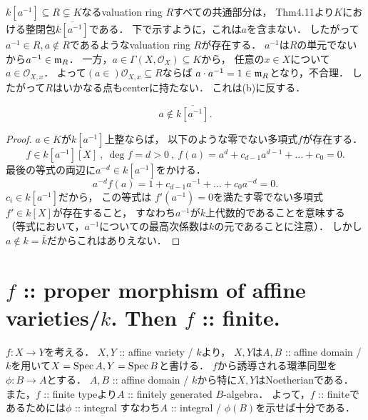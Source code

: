 \documentclass[a4paper]{jsarticle}
\newcommand{\shO}{\mathcal{O}}
\begin{document}
    $k[a^{-1}] \subseteq R \subsetneq K$なるvaluation ring $R$すべての共通部分は，
    Thm4.11より$K$における整閉包$\overline{k[a^{-1}]}$である．
    下で示すように，これは$a$を含まない．
    したがって$a^{-1} \in R, a \not \in R$であるようなvaluation ring $R$が存在する．
    $a^{-1}$は$R$の単元でないから$a^{-1} \in \mathfrak{m}_R$．
    一方，$a \in \Gamma(X, \shO_X) \subseteq K$から，
    任意の$x \in X$について$a \in \shO_{X,x}$．
    よって$(a \in )\shO_{X,x} \subseteq R$ならば
    $a \cdot a^{-1}=1 \in \mathfrak{m}_R$となり，不合理．
    したがって$R$はいかなる点もcenterに持たない．
    これは(b)に反する．

    \begin{Claim}
     \[ a \not \in \overline{k[a^{-1}]}. \] 
    \end{Claim}
    \begin{proof}
        $a \in K$が$k[a^{-1}]$上整ならば，
        以下のような零でない多項式$f$が存在する．
        \[ f \in k[a^{-1}][X] ~,~ \deg f=d>0 ~,~ f(a)=a^d+c_{d-1}a^{d-1}+\dots+c_0=0. \]
        最後の等式の両辺に$a^{-d} \in k[a^{-1}]$をかける．
        \[ a^{-d}f(a)=1+c_{d-1}a^{-1}+\dots+c_0a^{-d}=0. \]
        $c_i \in k[a^{-1}]$だから，
        この等式は
        $f'(a^{-1})=0$を満たす零でない多項式$f' \in k[X]$が存在すること，
        すなわち$a^{-1}$が$k$上代数的であることを意味する
        （等式において，$a^{-1}$についての最高次係数は$k$の元であることに注意）．
        しかし$a \not \in k=\bar{k}$だからこれはありえない．
    \end{proof}


\section{$f$ :: proper morphism of affine varieties/$k$. Then $f$ :: finite.} %
    $f: X \to Y$を考える．
    $X,Y$ :: affine variety / $k$より，
    $X,Y$は$A, B$ :: affine domain / $k$を用いて$X=\operatorname{Spec} A, Y=\operatorname{Spec} B$と書ける．
    $f$から誘導される環準同型を$\phi: B \to A$とする．
    $A, B$ :: affine domain / $k$から特に$X, Y$はNoetherianである．
    また，$f$ :: finite typeより$A$ :: finitely generated $B$-algebra．
    よって，$f$ :: finiteであるためには$\phi$ :: integral
    すなわち$A$ :: integral / $\phi(B)$を示せば十分である．
\end{document}
